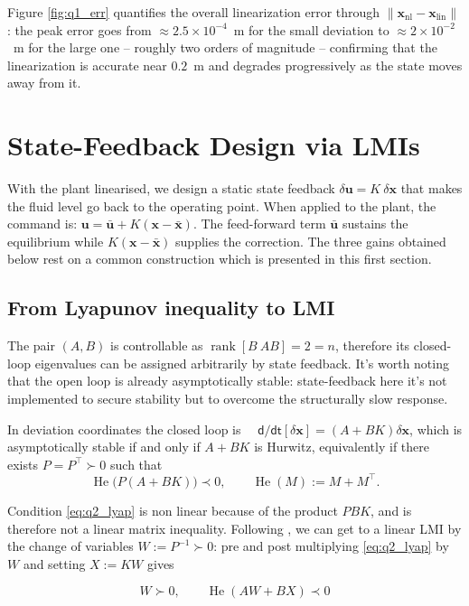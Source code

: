 \documentclass[10pt,a4paper]{scrartcl}
\newcommand{\RuleSection}[1]{%
\section{#1}%
\vspace{0.2em}{\color{accent!35}\hrule height 0.4pt}\vspace{0.3em}%
}
\begin{document}
Figure \ref{fig:q1_err} quantifies the overall linearization error through $\| \bm x_{\text{nl}} - \bm x_{\text{lin}} \|$: the peak error goes from  $\approx2.5\times10^{-4}$~m for the small deviation to $\approx2\times 10^{-2}$~m for the large one -- roughly two orders of magnitude --
confirming that the linearization is accurate near $0.2$~m and degrades progressively as the state moves away from it.

\RuleSection{State-Feedback Design via LMIs}
\label{sec:q2}

With the plant linearised, we design a static state feedback $\delta \bm u = K \ \delta \bm x$ that makes the fluid level go back to the operating point. When applied to the plant, the command is: $\bm u = \bm{\bar u} + K(\bm{x} - \bm{\bar x})$. The feed-forward term $\bm{\bar u}$ sustains the equilibrium while $ K(\bm{x} - \bm{\bar x}) $ supplies the correction. The three gains obtained below rest on a common construction which is presented in this first section.

\subsection{From Lyapunov inequality to LMI}

The pair $(A,B)$ is controllable as $\operatorname{rank}[B \ AB] = 2 = n$, therefore its closed-loop eigenvalues can be assigned arbitrarily by state feedback. It's worth noting that the open loop is already asymptotically stable: state-feedback here it's not implemented to secure stability but to overcome the structurally slow response.  


In deviation coordinates the closed loop is $\quad \mathsf{d/dt} [\delta\bm{x}]
=(A+BK)\delta\bm{x}$, which is asymptotically stable if and only if $A+BK$
is Hurwitz, equivalently if there exists $P=P^\top\succ0$ such that
\begin{equation}
    \operatorname{He}\!\big(P(A+BK)\big)\prec0,\qquad
    \operatorname{He}(M):=M+M^\top.
    \label{eq:q2_lyap}
\end{equation}


Condition \eqref{eq:q2_lyap} is non linear because of the product $PBK$, and is therefore not a linear matrix inequality. Following \citep{zaccarian_lmi}, we can get to a linear LMI by the change of variables $W := P^{-1} \succ 0$: pre and post multiplying \eqref{eq:q2_lyap} by $W$ and setting $X := KW$ gives 


\begin{equation}
    W \succ 0, \qquad \operatorname{He}(AW + BX) \prec 0
    \label{eq:q2_baselmi}
\end{equation}
\end{document}
